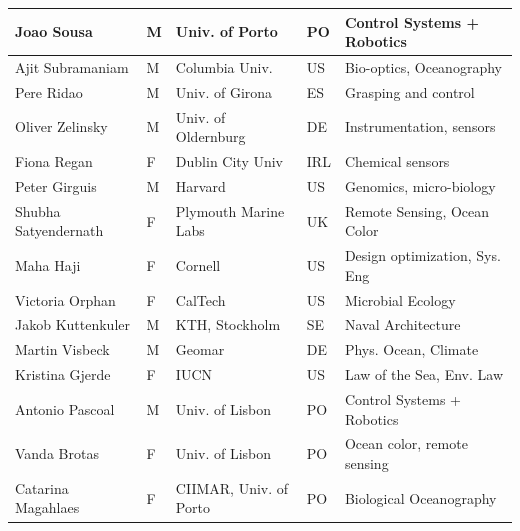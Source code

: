 \begin{table}[H]
{\begin{tabular}{|p{3cm}|p{0.5cm}|p{3.5cm}|p{0.5cm}|p{6cm}|}
\hline
Joao Sousa               & M   & Univ. of Porto                        & PO       & Control Systems + Robotics                      \\
\hline
Ajit Subramaniam         & M   & Columbia Univ.                        & US       & Bio-optics, Oceanography                        \\
\hline
Pere Ridao               & M   & Univ. of Girona                       & ES       & Grasping and control                            \\
\hline
Oliver Zelinsky          & M   & Univ. of Oldernburg                   & DE       & Instrumentation, sensors                        \\
\hline
Fiona Regan              & F   & Dublin City Univ                      & IRL      & Chemical sensors                                \\
\hline
Peter Girguis            & M   & Harvard                               & US       & Genomics, micro-biology                         \\
\hline
Shubha Satyendernath     & F   & Plymouth Marine Labs                  & UK       & Remote Sensing, Ocean Color                     \\
\hline
Maha Haji                & F   & Cornell                               & US       & Design optimization, Sys. Eng                   \\
\hline
Victoria Orphan          & F   & CalTech                               & US       & Microbial Ecology                               \\
\hline
Jakob Kuttenkuler        & M   & KTH, Stockholm                        & SE       & Naval Architecture                              \\
\hline
Martin Visbeck           & M   & Geomar                                & DE       & Phys. Ocean, Climate                            \\
\hline
Kristina Gjerde          & F   & IUCN                                  & US       & Law of the Sea, Env. Law                        \\
\hline
Antonio Pascoal          & M   & Univ. of Lisbon                       & PO       & Control Systems + Robotics                      \\
\hline
Vanda Brotas             & F   & Univ. of Lisbon                       & PO       & Ocean color, remote sensing                     \\
\hline
Catarina Magahlaes       & F   & CIIMAR, Univ. of Porto                & PO       & Biological Oceanography                         \\

\end{tabular}}
\end{table}

